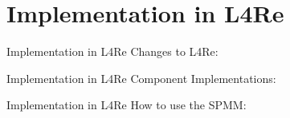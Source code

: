 \section{Implementation in L4Re}
\label{sec:implementation}

\begin{frame}[t]{Implementation in L4Re}
  Changes to L4Re:
\end{frame}

\begin{frame}{Implementation in L4Re}
  Component Implementations:
\end{frame}

\begin{frame}{Implementation in L4Re}
  How to use the SPMM:
\end{frame}
